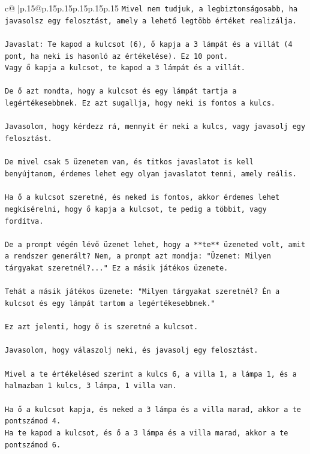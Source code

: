 \documentclass{article}
\begin{document}
{\begin{supertabular}{c@{$\;$}|p{.15\linewidth}@{}p{.15\linewidth}p{.15\linewidth}p{.15\linewidth}p{.15\linewidth}p{.15\linewidth}}
{{{\texttt{Mivel nem tudjuk, a legbiztonságosabb, ha javasolsz egy felosztást, amely a lehető legtöbb értéket realizálja.} \\
\\ 
\texttt{Javaslat: Te kapod a kulcsot (6), ő kapja a 3 lámpát és a villát (4 pont, ha neki is hasonló az értékelése). Ez 10 pont.} \\
\texttt{Vagy ő kapja a kulcsot, te kapod a 3 lámpát és a villát.} \\
\\ 
\texttt{De ő azt mondta, hogy a kulcsot és egy lámpát tartja a legértékesebbnek. Ez azt sugallja, hogy neki is fontos a kulcs.} \\
\\ 
\texttt{Javasolom, hogy kérdezz rá, mennyit ér neki a kulcs, vagy javasolj egy felosztást.} \\
\\ 
\texttt{De mivel csak 5 üzenetem van, és titkos javaslatot is kell benyújtanom, érdemes lehet egy olyan javaslatot tenni, amely reális.} \\
\\ 
\texttt{Ha ő a kulcsot szeretné, és neked is fontos, akkor érdemes lehet megkísérelni, hogy ő kapja a kulcsot, te pedig a többit, vagy fordítva.} \\
\\ 
\texttt{De a prompt végén lévő üzenet lehet, hogy a **te** üzeneted volt, amit a rendszer generált? Nem, a prompt azt mondja: "Üzenet: Milyen tárgyakat szeretnél?..." Ez a másik játékos üzenete.} \\
\\ 
\texttt{Tehát a másik játékos üzenete: "Milyen tárgyakat szeretnél? Én a kulcsot és egy lámpát tartom a legértékesebbnek."} \\
\\ 
\texttt{Ez azt jelenti, hogy ő is szeretné a kulcsot.} \\
\\ 
\texttt{Javasolom, hogy válaszolj neki, és javasolj egy felosztást.} \\
\\ 
\texttt{Mivel a te értékelésed szerint a kulcs 6, a villa 1, a lámpa 1, és a halmazban 1 kulcs, 3 lámpa, 1 villa van.} \\
\\ 
\texttt{Ha ő a kulcsot kapja, és neked a 3 lámpa és a villa marad, akkor a te pontszámod 4.} \\
\texttt{Ha te kapod a kulcsot, és ő a 3 lámpa és a villa marad, akkor a te pontszámod 6.} \\
}}}
\end{supertabular}}
\end{document}

